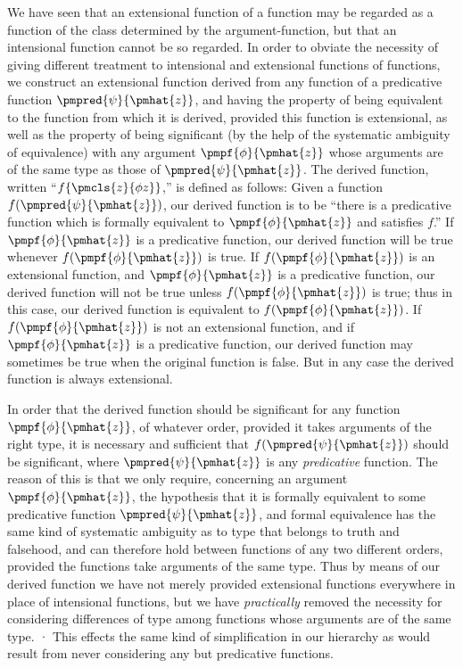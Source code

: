 \documentclass[letterpaper,12pt,openany,leqno]{book}
\begin{document}
We have seen that an extensional function of a function may be regarded as a function of the class determined by the argument-function, but that an intensional function cannot be so regarded. In order to obviate the necessity of giving different treatment to intensional and extensional functions of functions, we construct an extensional function derived from any function of a predicative function $\pmpred{\psi}{\pmhat{z}}$, and having the property of being equivalent to the function from which it is derived, provided this function is extensional, as well as the property of being significant (by the help of the systematic ambiguity of equivalence) with any argument $\pmpf{\phi}{\pmhat{z}}$ whose arguments are of the same type as those of $\pmpred{\psi}{\pmhat{z}}$. The derived function, written ``$f\{\pmcls{z}{\phi z}\}$,'' is defined as follows: Given a function $f(\pmpred{\psi}{\pmhat{z}})$, our derived function is to be ``there is a predicative function which is formally equivalent to $\pmpf{\phi}{\pmhat{z}}$ and satisfies $f$.'' If $\pmpf{\phi}{\pmhat{z}}$ is a predicative function, our derived function will be true whenever $f(\pmpf{\phi}{\pmhat{z}})$ is true. If $f(\pmpf{\phi}{\pmhat{z}})$ is an extensional function, and $\pmpf{\phi}{\pmhat{z}}$ is a predicative function, our derived function will not be true unless $f(\pmpf{\phi}{\pmhat{z}})$ is true; thus in this case, our derived function is equivalent to $f(\pmpf{\phi}{\pmhat{z}})$. If $f(\pmpf{\phi}{\pmhat{z}})$ is not an extensional function, and if $\pmpf{\phi}{\pmhat{z}}$ is a predicative function, our derived function may sometimes be true when the original function is false. But in any case the derived function is always extensional.

In order that the derived function should be significant for any function $\pmpf{\phi}{\pmhat{z}}$, of whatever order, provided it takes arguments of the right type, it is necessary and sufficient that $f(\pmpred{\psi}{\pmhat{z}})$ should be significant, where $\pmpred{\psi}{\pmhat{z}}$ is any \textit{predicative} function. The reason of this is that we only require, concerning an argument $\pmpf{\phi}{\pmhat{z}}$, the hypothesis that it is formally equivalent to some predicative function $\pmpred{\psi}{\pmhat{z}}$, and formal equivalence has the same kind of systematic ambiguity as to type that belongs to truth and falsehood, and can therefore hold between functions of any two different orders, provided the functions take arguments of the same type. Thus by means of our derived function we have not merely provided extensional functions everywhere in place of intensional functions, but we have \textit{practically} removed the necessity for considering differences of type among functions whose arguments are of the same type. · This effects the same kind of simplification in our hierarchy as would result from never considering any but predicative functions.
\end{document}
